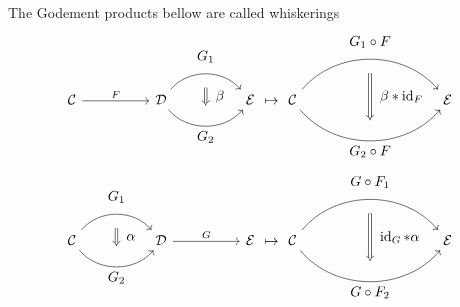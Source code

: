 \begin{defi}
    The Godement products bellow are called whiskerings
    \[
    \begin{tikzcd}[column sep = huge]
    	\mathcal{C}
    		\ar[r, " F "]
    	&
    	\mathcal{D}
    		\arrow[bend left=50]{r}[name=U',label=above:$G_1$]{}
    		\arrow[bend right=50]{r}[name=D',label=below:$G_2$]{}
    	&
    	\mathcal{E} 
    		\arrow[shorten <=10pt,shorten >=10pt,Rightarrow,to path={(U') -- node[label=right:$\beta$] {} (D')}]{} 
    \end{tikzcd}
	\mapsto
	\begin{tikzcd}[column sep = huge]
		\mathcal{ C }
			\arrow[bend left=50]{rr}[name=U',label=above:$G_1 \circ F$]{}
			\arrow[bend right=50]{rr}[name=D',label=below:$G_2 \circ F $]{}
		&&
		\mathcal{ E }
			\arrow[shorten <=10pt,shorten >=10pt,Rightarrow,to path={(U') -- node[label=right:$\beta*\id_F$] {} (D')}]{} 
	\end{tikzcd}
	\]
	\[
	\begin{tikzcd}[column sep = huge]
		\mathcal{C}
		\arrow[bend left=50]{r}[name=U',label=above:$G_1$]{}
		\arrow[bend right=50]{r}[name=D',label=below:$G_2$]{}
		&
		\mathcal{D} 
		\arrow[shorten <=10pt,shorten >=10pt,Rightarrow,to path={(U') -- node[label=right:$\alpha$] {} (D')}]{} 
		\ar[r, " G"]
		&
		\mathcal{ E }
	\end{tikzcd}
	\mapsto
	\begin{tikzcd}[column sep = huge]
		\mathcal{ C }
		\arrow[bend left=50]{rr}[name=U',label=above:$G \circ F_1$]{}
		\arrow[bend right=50]{rr}[name=D',label=below:$G \circ F_2 $]{}
		&&
		\mathcal{ E }
		\arrow[shorten <=10pt,shorten >=10pt,Rightarrow,to path={(U') -- node[label=right:$\id_G*\alpha$] {} (D')}]{} 
	\end{tikzcd}
	\]
	
\end{defi}

